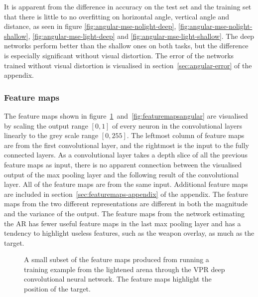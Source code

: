 It is apparent from the difference in accuracy on the test set and the training set that there is little to no overfitting on horizontal angle, vertical angle and distance, as seen in figure \ref{fig:angular-mse-nolight-deep}, \ref{fig:angular-mse-nolight-shallow}, \ref{fig:angular-mse-light-deep} and \ref{fig:angular-mse-light-shallow}. The deep networks perform better than the shallow ones on both tasks, but the difference is especially significant without visual distortion. The error of the networks trained without visual distortion is visualised in section~\ref{sec:angular-error} of the appendix.


\clearpage
\subsubsection{Feature maps}
\label{sec:featuremaps}
The feature maps shown in figure~\ref{fig:featuremapsvpr}~and~\ref{fig:featuremapsangular} are visualised by scaling the output range $[0,1]$ of every neuron in the convolutional layers linearly to the grey scale range $[0,255]$. The leftmost column of feature maps are from the first convolutional layer, and the rightmost is the input to the fully connected layers. As a convolutional layer takes a depth slice of all the previous feature maps as input, there is no apparent connection between the visualised output of the max pooling layer and the following result of the convolutional layer. All of the feature maps are from the same input. Additional feature maps are included in section~\ref{sec:featuremaps-appendix} of the appendix. The feature maps from the two different representations are different in both the magnitude and the variance of the output. The feature maps from the network estimating the AR has fewer useful feature maps in the last max pooling layer and has a tendency to highlight useless features, such as the weapon overlay, as much as the target.

\begin{figure}[H]
	\begin{scriptsize}
		\sffamily
		\def\svgwidth{\textwidth}
		
	\end{scriptsize}
	\caption[Feature maps for the CNN using VPR]{A small subset of the feature maps produced from running a training example from the lightened arena through the VPR deep convolutional neural network. The feature maps highlight the position of the target.}
	\label{fig:featuremapsvpr}
\end{figure}

